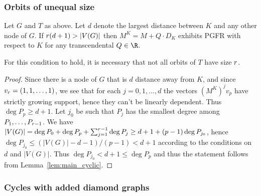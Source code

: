 \subsubsection{Orbits of unequal size}

 \begin{theorem}\label{thm:main_psymm}
 Let $G$ and $T$ as above. Let $d$ denote the largest distance between $K$ and any other node of $G$. If $r(d+1) > |V(G)|$ then $M^K = M+Q\cdot D_K$ exhibits PGFR with respect to $K$ for any transcendental $Q \in \R$. 
  \end{theorem}
 
 \begin{rema}
 For this condition to hold, it is necessary that not all orbits of $T$ have size $r$. 
 \end{rema}
 
 \begin{proof}
 Since there is a node of $G$ that is $d$ distance away from $K$, and since $v_{r} = (1,1,\dots, 1)$, we see that for each $j = 0, 1, \dots, d$ the vectors $(M^K)^j v_p$ have strictly growing support, hence they can't be linearly dependent. Thus $\deg P_p \geq d+1$. Let $j_0$ be such that $P_j$ has the smallest degree among $P_1, \dots, P_{r-1}$.  We have $|V(G)|  = \deg P_0 + \deg P_p + \sum_{j=1}^{r-1} \deg P_j \geq d+1 + (p-1)\deg P_{j_0}$, hence $\deg P_{j_0} \leq (|V(G)|-d-1)/(p-1) < d+1$ according to the conditions on $d$ and $|V(G)|$. Thus $\deg P_{j_0} < d+1 \leq \deg P_p$ and thus the statement follows from Lemma~\ref{lem:main_cyclic}. 
 \end{proof}
 
\subsubsection{Cycles with added diamond graphs}

